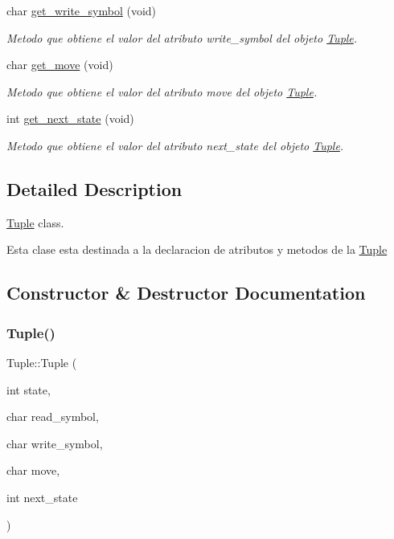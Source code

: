 \begin{DoxyCompactItemize}
char \hyperlink{class_tuple_ad6d027648b6aee2ea637a24aac83fbc7}{get\+\_\+write\+\_\+symbol} (void)
\begin{DoxyCompactList}\small\item\em Metodo que obtiene el valor del atributo \textquotesingle{}write\+\_\+symbol\textquotesingle{} del objeto \hyperlink{class_tuple}{Tuple}. \end{DoxyCompactList}\item 
char \hyperlink{class_tuple_a0e8a736d8bace29dba549d4ff5d00024}{get\+\_\+move} (void)
\begin{DoxyCompactList}\small\item\em Metodo que obtiene el valor del atributo \textquotesingle{}move\textquotesingle{} del objeto \hyperlink{class_tuple}{Tuple}. \end{DoxyCompactList}\item 
int \hyperlink{class_tuple_a7f76456c7be5611575598eca238bf0f2}{get\+\_\+next\+\_\+state} (void)
\begin{DoxyCompactList}\small\item\em Metodo que obtiene el valor del atributo \textquotesingle{}next\+\_\+state\textquotesingle{} del objeto \hyperlink{class_tuple}{Tuple}. \end{DoxyCompactList}\end{DoxyCompactItemize}


\subsection{Detailed Description}
\hyperlink{class_tuple}{Tuple} class. 

Esta clase esta destinada a la declaracion de atributos y metodos de la \hyperlink{class_tuple}{Tuple} 

\subsection{Constructor \& Destructor Documentation}
\hypertarget{class_tuple_ac77c891ea9cd8bdebeea6ad26002b9e6}{}\label{class_tuple_ac77c891ea9cd8bdebeea6ad26002b9e6} 
\subsubsection{\texorpdfstring{Tuple()}{Tuple()}}
{\footnotesize\ttfamily Tuple\+::\+Tuple (\begin{DoxyParamCaption}\item[{int}]{state,  }\item[{char}]{read\+\_\+symbol,  }\item[{char}]{write\+\_\+symbol,  }\item[{char}]{move,  }\item[{int}]{next\+\_\+state }\end{DoxyParamCaption})}



